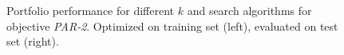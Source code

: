 \documentclass[conference]{IEEEtran}
\begin{document}
\begin{figure}[t]
	\centering
	\hfil
	\caption{
		Portfolio performance for different $k$ and search algorithms for objective \emph{PAR-2}.
		Optimized on training set (left), evaluated on test set (right). 
	}
\label{fig:search-train-objective}
\end{figure}
\end{document}
